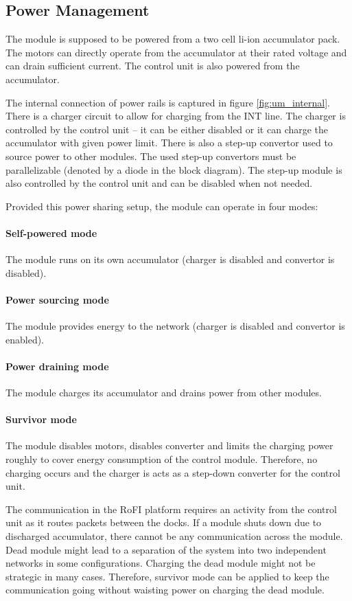 \subsection{Power Management}

The module is supposed to be powered from a two cell li-ion accumulator pack.
The motors can directly operate from the accumulator at their rated voltage and
can drain sufficient current. The control unit is also powered from the
accumulator.

The internal connection of power rails is captured in figure
\ref{fig:um_internal}. There is a charger circuit to allow for charging from the
INT line. The charger is controlled by the control unit -- it can be either
disabled or it can charge the accumulator with given power limit. There is also
a step-up convertor used to source power to other modules. The used step-up
convertors must be parallelizable (denoted by a diode in the block diagram). The
step-up module is also controlled by the control unit and can be disabled when
not needed.

Provided this power sharing setup, the module can operate in four modes:

\paragraph{Self-powered mode} The module runs on its own accumulator (charger is
disabled and convertor is disabled).

\paragraph{Power sourcing mode} The module provides energy to the network
(charger is disabled and convertor is enabled).

\paragraph{Power draining mode} The module charges its accumulator and drains
power from other modules.

\paragraph{Survivor mode} The module disables motors, disables converter and
limits the charging power roughly to cover energy consumption of the control
module. Therefore, no charging occurs and the charger is acts as a step-down
converter for the control unit.

The communication in the RoFI platform requires an activity from the control
unit as it routes packets between the docks. If a module shuts down due to
discharged accumulator, there cannot be any communication across the module.
Dead module might lead to a separation of the system into two independent
networks in some configurations. Charging the dead module might not be strategic
in many cases. Therefore, survivor mode can be applied to keep the communication
going without waisting power on charging the dead module.
